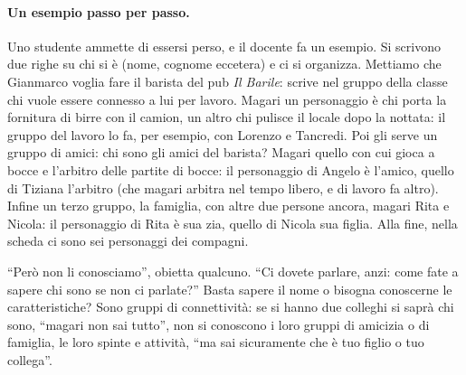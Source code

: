 \paragraph{Un esempio passo per passo.} Uno studente ammette di essersi perso, e il
docente fa un esempio. Si scrivono due righe su chi si è (nome, cognome eccetera) e
ci si organizza. Mettiamo che Gianmarco voglia fare il barista del pub \emph{Il
Barile}: scrive nel gruppo della classe chi vuole essere connesso a lui per lavoro.
Magari un personaggio è chi porta la fornitura di birre con il camion, un altro chi
pulisce il locale dopo la nottata: il gruppo del lavoro lo fa, per esempio, con
Lorenzo e Tancredi. Poi gli serve un gruppo di amici: chi sono gli amici del
barista? Magari quello con cui gioca a bocce e l'arbitro delle partite di bocce: il
personaggio di Angelo è l'amico, quello di Tiziana l'arbitro (che magari arbitra nel
tempo libero, e di lavoro fa altro). Infine un terzo gruppo, la famiglia, con altre
due persone ancora, magari Rita e Nicola: il personaggio di Rita è sua zia, quello
di Nicola sua figlia. Alla fine, nella scheda ci sono sei personaggi dei compagni.

``Però non li conosciamo'', obietta qualcuno. ``Ci dovete parlare, anzi: come fate
a sapere chi sono se non ci parlate?'' Basta sapere il nome o bisogna conoscerne le
caratteristiche? Sono gruppi di connettività: se si hanno due colleghi si saprà
chi sono, ``magari non sai tutto'', non si conoscono i loro gruppi di amicizia o di
famiglia, le loro spinte e attività, ``ma sai sicuramente che è tuo figlio o tuo
collega''.

